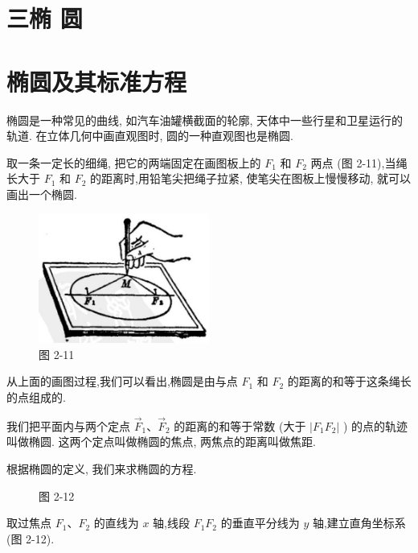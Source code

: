 \documentclass[lang=cn,newtx,12pt,scheme=chinese]{elegantbook}
\begin{document}
\section*{三\text{ }椭 圆}

\section{ 椭圆及其标准方程}

椭圆是一种常见的曲线, 如汽车油罐横截面的轮廓, 天体中一些行星和卫星运行的轨道. 在立体几何中画直观图时, 圆的一种直观图也是椭圆.

取一条一定长的细绳, 把它的两端固定在画图板上的 \({F}_{1}\) 和 \({F}_{2}\) 两点 (图 2-11),当绳长大于 \({F}_{1}\) 和 \({F}_{2}\) 的距离时,用铅笔尖把绳子拉紧, 使笔尖在图板上慢慢移动, 就可以画出一个椭圆.

\begin{figure}[h]
  \centering
  \includegraphics[max width=0.5\textwidth]{images/01912cc2-ffb6-728e-9ae7-b113ff05c64b_86_465051.jpg}
  \caption{图 2-11}
\end{figure}

从上面的画图过程,我们可以看出,椭圆是由与点 \({F}_{1}\) 和 \({F}_{2}\) 的距离的和等于这条绳长的点组成的.
\begin{definition}[椭圆] 
我们把平面内与两个定点 \({\overrightarrow{F}}_{1}\text{、}{\overrightarrow{F}}_{2}\) 的距离的和等于常数 (大于 \(\left| {{F}_{1}{F}_{2}}\right|\) ) 的点的轨迹叫做椭圆. 这两个定点叫做椭圆的焦点, 两焦点的距离叫做焦距.
\end{definition}
根据椭圆的定义, 我们来求椭圆的方程.

\begin{figure}[h]
  \centering
  
  \caption{图 2-12}
\end{figure}

取过焦点 \({F}_{1}\text{、}{F}_{2}\) 的直线为 \(x\) 轴,线段 \({F}_{1}{F}_{2}\) 的垂直平分线为 \(y\) 轴,建立直角坐标系 (图 2-12).
\end{document}
